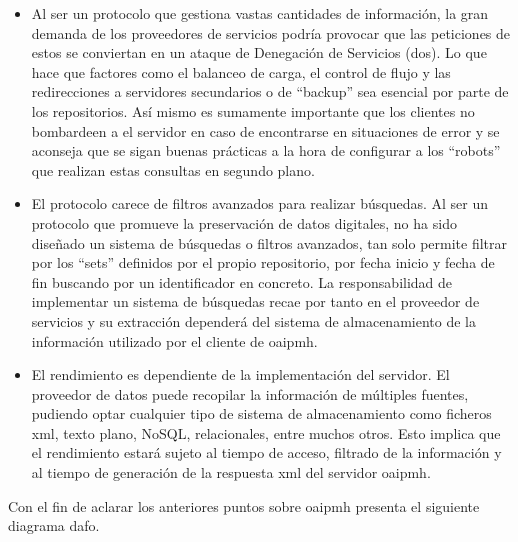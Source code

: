 \begin{itemize}
	\item Al ser un protocolo que gestiona vastas cantidades de información, la gran demanda de los proveedores de servicios podría provocar que las peticiones de estos se conviertan en un ataque de Denegación de Servicios (\acrshort{dos}). Lo que hace que factores como el balanceo de carga, el control de flujo y las redirecciones a servidores secundarios o de ``backup'' sea  esencial por parte de los repositorios. Así mismo es sumamente importante que los clientes no bombardeen a el servidor en caso de encontrarse en situaciones de error y se aconseja que se sigan buenas prácticas a la hora de configurar a los ``robots'' que realizan estas consultas en segundo plano.

	\item El protocolo carece de filtros avanzados para realizar búsquedas. Al ser un protocolo que promueve la preservación de datos digitales, no ha sido diseñado un sistema de búsquedas o filtros avanzados, tan solo permite filtrar por los ``sets'' definidos por el propio repositorio, por fecha inicio y fecha de fin buscando por un identificador en concreto. La responsabilidad de implementar un sistema de búsquedas recae por tanto en el proveedor de servicios y su extracción dependerá del sistema de almacenamiento de la información utilizado por el cliente de \acrshort{oaipmh}.

	\item El rendimiento es dependiente de la implementación del servidor. El proveedor de datos puede recopilar la información de múltiples fuentes, pudiendo optar cualquier tipo de sistema de almacenamiento como ficheros \acrshort{xml}, texto plano, NoSQL\cite{NoSQL},  relacionales, entre muchos otros. Esto implica que el rendimiento estará sujeto al tiempo de acceso, filtrado de la información y al tiempo de generación de la respuesta \acrshort{xml} del servidor \acrshort{oaipmh}.
\end{itemize}

Con el fin de aclarar los anteriores puntos sobre \acrshort{oaipmh} presenta el siguiente diagrama \acrfull{dafo}.

